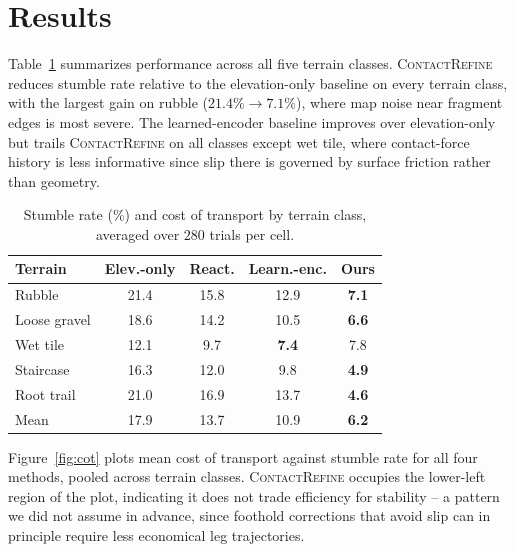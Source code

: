 \section{Results}
Table~\ref{tab:results} summarizes performance across all five terrain classes.
\textsc{ContactRefine} reduces stumble rate relative to the elevation-only baseline on every
terrain class, with the largest gain on rubble ($21.4\% \to 7.1\%$), where map noise near
fragment edges is most severe. The learned-encoder baseline improves over elevation-only but
trails \textsc{ContactRefine} on all classes except wet tile, where contact-force history is
less informative since slip there is governed by surface friction rather than geometry.

\begin{table}[t]
\centering
\caption{Stumble rate (\%) and cost of transport by terrain class, averaged over $280$ trials per cell.}
\label{tab:results}
\footnotesize
\begin{tabular}{@{}lcccc@{}}
\toprule
\textbf{Terrain} & \textbf{Elev.-only} & \textbf{React.} & \textbf{Learn.-enc.} & \textbf{Ours} \\
\midrule
Rubble        & 21.4 & 15.8 & 12.9 & \textbf{7.1} \\
Loose gravel  & 18.6 & 14.2 & 10.5 & \textbf{6.6} \\
Wet tile      & 12.1 & 9.7  & \textbf{7.4}  & 7.8 \\
Staircase     & 16.3 & 12.0 & 9.8  & \textbf{4.9} \\
Root trail    & 21.0 & 16.9 & 13.7 & \textbf{4.6} \\
\midrule
Mean          & 17.9 & 13.7 & 10.9 & \textbf{6.2} \\
\bottomrule
\end{tabular}
\end{table}

Figure~\ref{fig:cot} plots mean cost of transport against stumble rate for all four methods,
pooled across terrain classes. \textsc{ContactRefine} occupies the lower-left region of the
plot, indicating it does not trade efficiency for stability -- a pattern we did not assume in
advance, since foothold corrections that avoid slip can in principle require less economical
leg trajectories.

